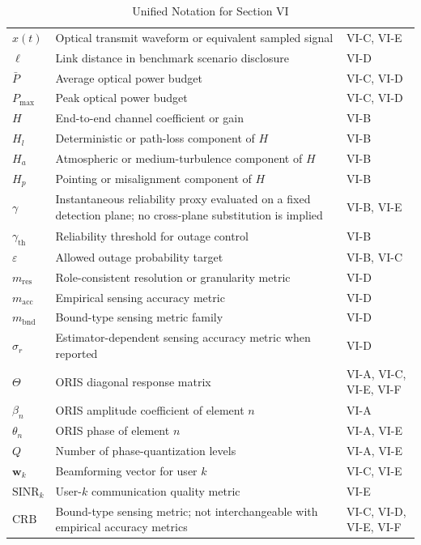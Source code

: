 \begin{table}[htbp]
\caption{Unified Notation for Section VI}
\label{tab:section6_notation}
\centering
\setlength{\tabcolsep}{4pt}
\renewcommand{\arraystretch}{1.1}
\begin{tabularx}{\textwidth}{@{}L{2.4cm}Y L{2.2cm}@{}}
\toprule
{} &  &  \\
\midrule
$x(t)$ & Optical transmit waveform or equivalent sampled signal & VI-C, VI-E \\
$\ell$ & Link distance in benchmark scenario disclosure & VI-D \\
$\bar P$ & Average optical power budget & VI-C, VI-D \\
$P_{\max}$ & Peak optical power budget & VI-C, VI-D \\
$H$ & End-to-end channel coefficient or gain & VI-B \\
$H_l$ & Deterministic or path-loss component of $H$ & VI-B \\
$H_a$ & Atmospheric or medium-turbulence component of $H$ & VI-B \\
$H_p$ & Pointing or misalignment component of $H$ & VI-B \\
$\gamma$ & Instantaneous reliability proxy evaluated on a fixed detection plane; no cross-plane substitution is implied & VI-B, VI-E \\
$\gamma_{\text{th}}$ & Reliability threshold for outage control & VI-B \\
$\varepsilon$ & Allowed outage probability target & VI-B, VI-C \\
$m_{\text{res}}$ & Role-consistent resolution or granularity metric & VI-D \\
$m_{\text{acc}}$ & Empirical sensing accuracy metric & VI-D \\
$m_{\text{bnd}}$ & Bound-type sensing metric family & VI-D \\
$\sigma_r$ & Estimator-dependent sensing accuracy metric when reported & VI-D \\
$\Theta$ & ORIS diagonal response matrix & VI-A, VI-C, VI-E, VI-F \\
$\beta_n$ & ORIS amplitude coefficient of element $n$ & VI-A \\
$\theta_n$ & ORIS phase of element $n$ & VI-A, VI-E \\
$Q$ & Number of phase-quantization levels & VI-A, VI-E \\
$\mathbf{w}_k$ & Beamforming vector for user $k$ & VI-C, VI-E \\
$\mathrm{SINR}_k$ & User-$k$ communication quality metric & VI-E \\
$\mathrm{CRB}$ & Bound-type sensing metric; not interchangeable with empirical accuracy metrics & VI-C, VI-D, VI-E, VI-F \\
\bottomrule
\end{tabularx}
\end{table}

